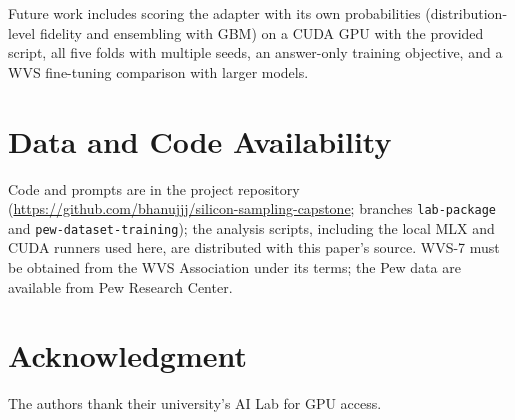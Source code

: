 \documentclass[conference]{IEEEtran}
\begin{document}
Future work includes scoring the adapter with its own probabilities (distribution-level fidelity and ensembling with GBM) on a CUDA GPU with the provided script, all five folds with multiple seeds, an answer-only training objective, and a WVS fine-tuning comparison with larger models.

\section*{Data and Code Availability}
Code and prompts are in the project repository (\url{https://github.com/bhanujjj/silicon-sampling-capstone}; branches \texttt{lab-package} and \texttt{pew-dataset-training}); the analysis scripts, including the local MLX and CUDA runners used here, are distributed with this paper's source. WVS-7 must be obtained from the WVS Association under its terms; the Pew data are available from Pew Research Center.

\section*{Acknowledgment}
The authors thank their university's AI Lab for GPU access.
\end{document}

